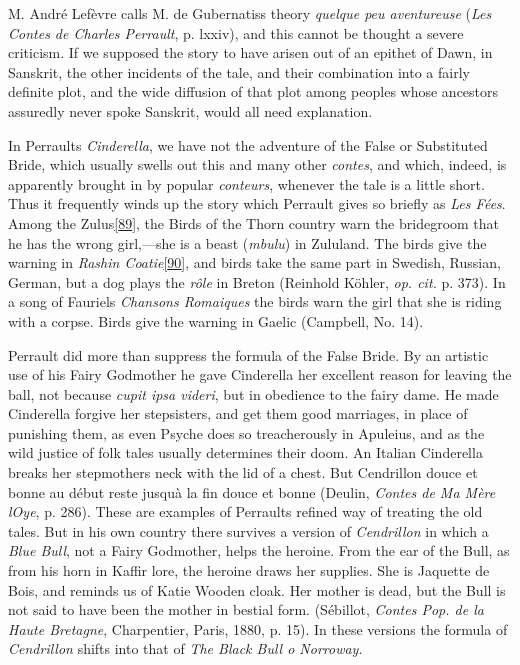 \documentclass[14pt,a4paper]{memoir}
\begin{document}
M. André Lefèvre calls M. de Gubernatis\textquotesingle s theory
\emph{quelque peu aventureuse} (\emph{Les Contes de Charles Perrault},
p. lxxiv), and this cannot be thought a severe criticism. If we supposed
the story to have arisen out of an epithet of Dawn, in Sanskrit, the
other incidents of the tale, and their combination into a fairly
definite plot, and the wide diffusion of that plot among peoples whose
ancestors assuredly never spoke Sanskrit, would all need explanation.

In Perrault\textquotesingle s \emph{Cinderella}, we have not the
adventure of the False or Substituted Bride, which usually swells out
this and many other \emph{contes}, and which, indeed, is apparently
brought in by popular \emph{conteurs}, whenever the tale is a little
short. Thus it frequently winds up the story which Perrault gives so
briefly as \emph{Les Fées}. Among the
Zulus\protect\hypertarget{4533318093929944247_33931-h-1.htm.xhtmlux5cux23FNanchor_89}{}{}\protect\hyperlink{4533318093929944247_33931-h-1.htm.xhtmlux5cux23Footnote_89}{{[}89{]}},
the Birds of the Thorn country warn the bridegroom that he has the wrong
girl,---she is a beast (\emph{mbulu}) in Zululand. The birds give the
warning in \emph{Rashin
Coatie}\protect\hypertarget{4533318093929944247_33931-h-1.htm.xhtmlux5cux23FNanchor_90}{}{}\protect\hyperlink{4533318093929944247_33931-h-1.htm.xhtmlux5cux23Footnote_90}{{[}90{]}},
and birds take the same part in Swedish, Russian, German, but a dog
plays the \emph{rôle} in Breton (Reinhold Köhler, \emph{op. cit.} p.
373). In a song of Fauriel\textquotesingle s \emph{Chansons Romaiques}
the birds warn the girl that she is riding with a corpse. Birds give the
warning in Gaelic (Campbell, No. 14).

Perrault did more than suppress the formula of the False Bride. By an
artistic use of his Fairy Godmother he gave Cinderella her excellent
reason for leaving the ball, not because \emph{cupit ipsa videri}, but
in obedience to the fairy dame. He made Cinderella forgive her
stepsisters, and get them good marriages, in place of punishing them, as
even Psyche does so treacherously in Apuleius, and as the wild justice
of folk tales usually determines their doom. An Italian Cinderella
breaks her stepmother\textquotesingle s neck with the lid of a chest.
But Cendrillon \textquotesingle douce et bonne au début reste
jusqu\textquotesingle à la fin douce et bonne\textquotesingle{} (Deulin,
\emph{Contes de Ma Mère l\textquotesingle Oye}, p. 286). These are
examples of Perrault\textquotesingle s refined way of treating the old
tales. But in his own country there survives a version of
\emph{Cendrillon} in which a \emph{Blue Bull}, not a Fairy Godmother,
helps the heroine. From the ear of the Bull, as from his horn in Kaffir
lore, the heroine draws her supplies. She is Jaquette de Bois, and
reminds us of Katie Wooden cloak. Her mother is dead, but the Bull is
not said to have been the mother in bestial form. (Sébillot,
\emph{Contes Pop. de la Haute Bretagne}, Charpentier, Paris, 1880, p.
15). In these versions the formula of \emph{Cendrillon} shifts into that
of \emph{The Black Bull o\textquotesingle{} Norroway}.
\end{document}
